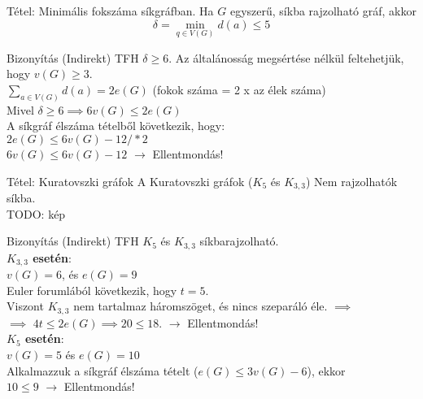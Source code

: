 \documentclass{beamer}
\begin{document}
\begin{frame}
\begin{block}{Tétel: Minimális fokszáma síkgráfban.}
Ha $G$ egyszerű, síkba rajzolható gráf, akkor $$\delta = \min_{{q \in V(G)}} d(a) \leq 5$$

\end{block}

\begin{block}{Bizonyítás (Indirekt)}
TFH $\delta \geq 6$.
Az általánosság megsértése nélkül feltehetjük, hogy $v(G) \geq 3$.\\
$\sum_{{a \in V(G)}} d(a) = 2e(G)$ (fokok száma = 2 x az élek száma)\\
Mivel $\delta \geq 6 \implies 6v(G) \leq 2e(G)$\\
A síkgráf élszáma tételből következik, hogy:\\
$2e(G) \leq 6v(G) - 12   / *2$\\
$6v(G) \leq 6v(G) - 12$ $\rightarrow$ Ellentmondás!

\end{block}

\end{frame}

\begin{frame}
\begin{block}{Tétel: Kuratovszki gráfok}
A Kuratovszki gráfok ($K_5$ és $K_{3,3}$) Nem rajzolhatók síkba.\\
TODO: kép

\end{block}

\begin{block}{Bizonyítás (Indirekt)}
TFH $K_5$ és $K_{3,3}$ síkbarajzolható.\\
\smallskip
\textbf{$K_{3,3}$ esetén}:\\
$v(G) = 6$, és $e(G) = 9$\\
Euler forumlából következik, hogy $t = 5$.\\
Viszont $K_{3,3}$ nem tartalmaz háromszöget, és nincs szeparáló éle. $\implies$\\
$\implies$ $4t \leq 2e(G) \implies 20 \leq 18$. $\rightarrow$ Ellentmondás!\\
\smallskip
\textbf{$K_5$ esetén}:\\
$v(G) = 5$ és $e(G) = 10$\\
Alkalmazzuk a síkgráf élszáma tételt ($e(G) \leq 3v(G) - 6$), ekkor\\
$10 \leq 9$ $\rightarrow$ Ellentmondás!

\end{block}

\end{frame}
\end{document}
